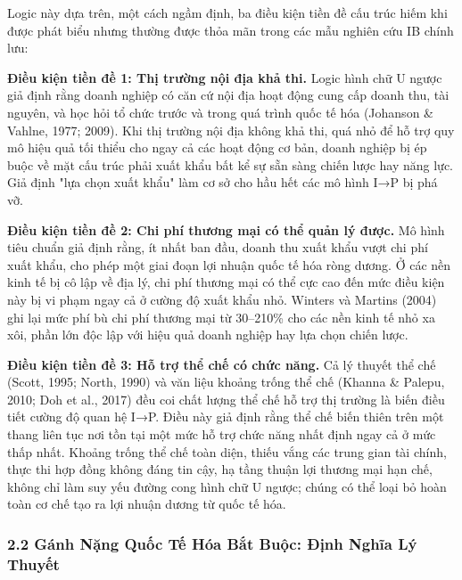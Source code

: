 \documentclass[12pt,a4paper]{article}
\begin{document}
Logic này dựa trên, một cách ngầm định, ba điều kiện tiền đề cấu trúc
hiếm khi được phát biểu nhưng thường được thỏa mãn trong các mẫu nghiên
cứu IB chính lưu:

\textbf{Điều kiện tiền đề 1: Thị trường nội địa khả thi.} Logic hình chữ
U ngược giả định rằng doanh nghiệp có căn cứ nội địa hoạt động cung cấp
doanh thu, tài nguyên, và học hỏi tổ chức trước và trong quá trình quốc
tế hóa (Johanson \& Vahlne, 1977; 2009). Khi thị trường nội địa không
khả thi, quá nhỏ để hỗ trợ quy mô hiệu quả tối thiểu cho ngay cả các
hoạt động cơ bản, doanh nghiệp bị ép buộc về mặt cấu trúc phải xuất khẩu
bất kể sự sẵn sàng chiến lược hay năng lực. Giả định "lựa chọn xuất
khẩu" làm cơ sở cho hầu hết các mô hình I→P bị phá vỡ.

\textbf{Điều kiện tiền đề 2: Chi phí thương mại có thể quản lý được.} Mô
hình tiêu chuẩn giả định rằng, ít nhất ban đầu, doanh thu xuất khẩu vượt
chi phí xuất khẩu, cho phép một giai đoạn lợi nhuận quốc tế hóa ròng
dương. Ở các nền kinh tế bị cô lập về địa lý, chi phí thương mại có thể
cực cao đến mức điều kiện này bị vi phạm ngay cả ở cường độ xuất khẩu
nhỏ. Winters và Martins (2004) ghi lại mức phí bù chi phí thương mại từ
30--210\% cho các nền kinh tế nhỏ xa xôi, phần lớn độc lập với hiệu quả
doanh nghiệp hay lựa chọn chiến lược.

\textbf{Điều kiện tiền đề 3: Hỗ trợ thể chế có chức năng.} Cả lý thuyết
thể chế (Scott, 1995; North, 1990) và văn liệu khoảng trống thể chế
(Khanna \& Palepu, 2010; Doh et al., 2017) đều coi chất lượng thể chế hỗ
trợ thị trường là biến điều tiết cường độ quan hệ I→P. Điều này giả định
rằng thể chế biến thiên trên một thang liên tục nơi tồn tại một mức hỗ
trợ chức năng nhất định ngay cả ở mức thấp nhất. Khoảng trống thể chế
toàn diện, thiếu vắng các trung gian tài chính, thực thi hợp đồng không
đáng tin cậy, hạ tầng thuận lợi thương mại hạn chế, không chỉ làm suy
yếu đường cong hình chữ U ngược; chúng có thể loại bỏ hoàn toàn cơ chế
tạo ra lợi nhuận dương từ quốc tế hóa.

\hypertarget{22-guxe1nh-nux1eb7ng-quux1ed1c-tux1ebf-huxf3a-bux1eaft-buux1ed9c-ux111ux1ecbnh-nghux129a-luxfd-thuyux1ebft}{%
\subsubsection{2.2 Gánh Nặng Quốc Tế Hóa Bắt Buộc: Định Nghĩa Lý
Thuyết}\label{22-guxe1nh-nux1eb7ng-quux1ed1c-tux1ebf-huxf3a-bux1eaft-buux1ed9c-ux111ux1ecbnh-nghux129a-luxfd-thuyux1ebft}}
\end{document}
